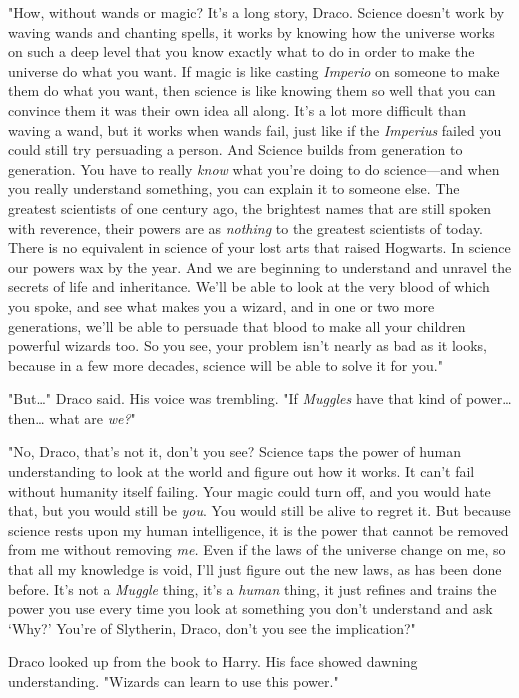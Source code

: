 "How, without wands or magic? It's a long story, Draco. Science doesn't work by
waving wands and chanting spells, it works by knowing how the universe works on
such a deep level that you know exactly what to do in order to make the
universe do what you want. If magic is like casting \emph{Imperio} on someone
to make them do what you want, then science is like knowing them so well that
you can convince them it was their own idea all along. It's a lot more
difficult than waving a wand, but it works when wands fail, just like if the
\emph{Imperius} failed you could still try persuading a person. And Science
builds from generation to generation. You have to really \emph{know} what
you're doing to do science---and when you really understand something, you can
explain it to someone else. The greatest scientists of one century ago, the
brightest names that are still spoken with reverence, their powers are as
\emph{nothing} to the greatest scientists of today. There is no equivalent in
science of your lost arts that raised Hogwarts. In science our powers wax by
the year. And we are beginning to understand and unravel the secrets of life
and inheritance. We'll be able to look at the very blood of which you spoke,
and see what makes you a wizard, and in one or two more generations, we'll be
able to persuade that blood to make all your children powerful wizards too. So
you see, your problem isn't nearly as bad as it looks, because in a few more
decades, science will be able to solve it for you."

"But{\ldots}" Draco said. His voice was trembling. "If \emph{Muggles} have that
kind of power{\ldots} then{\ldots} what are \emph{we?}"

"No, Draco, that's not it, don't you see? Science taps the power of human
understanding to look at the world and figure out how it works. It can't fail
without humanity itself failing. Your magic could turn off, and you would hate
that, but you would still be \emph{you}. You would still be alive to regret it.
But because science rests upon my human intelligence, it is the power that
cannot be removed from me without removing \emph{me.} Even if the laws of the
universe change on me, so that all my knowledge is void, I'll just figure out
the new laws, as has been done before. It's not a \emph{Muggle} thing, it's a
\emph{human} thing, it just refines and trains the power you use every time you
look at something you don't understand and ask `Why?' You're of Slytherin,
Draco, don't you see the implication?"

Draco looked up from the book to Harry. His face showed dawning understanding.
"Wizards can learn to use this power."

